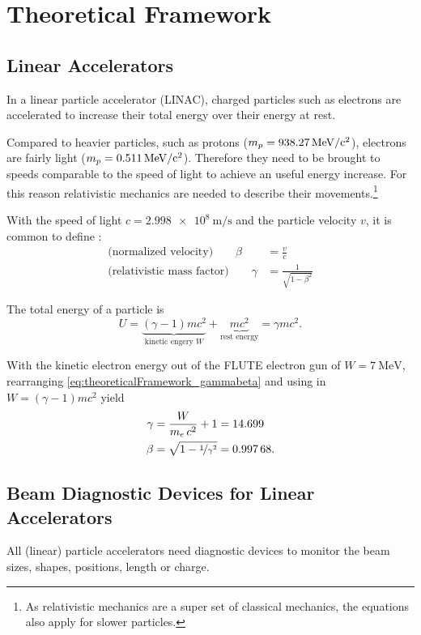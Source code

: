 \chapter{Theoretical Framework}
\section{Linear Accelerators}
In a linear particle accelerator (LINAC), charged particles such as electrons are accelerated to increase their total energy over their energy at rest.

Compared to heavier particles, such as protons ($m_p=\SI{938.27}{\mega\eV\per c\squared}$), electrons are fairly light ($m_p=\SI{0.511}{\mega\eV\per c\squared}$). Therefore they need to be brought to speeds comparable to the speed of light to achieve an useful energy increase. For this reason relativistic mechanics are needed to describe their movements.\footnote{As relativistic mechanics are a super set of classical mechanics, the equations also apply for slower particles.} \cite{Hinterberger1997}

With the speed of light $c=\SI{2.998e8}{\m\per\s}$ and the particle velocity $v$, it is common to define \cite{Wangler2008}:
\begin{align}\label{eq:theoreticalFramework_gammabeta}
\text{(normalized velocity)}\qquad\beta &= \frac{v}{c}\\
\text{(relativistic mass factor)}\qquad\gamma &= \frac{1}{\sqrt{1-\beta^2}}
\end{align}

The total energy of a particle is
\begin{equation}
U=\underbrace{\left(\gamma-1\right)mc^2}_{\text{kinetic engery } W} + \underbrace{mc^2}_{\text{rest energy}} = \gamma mc^2.
\end{equation}

With the kinetic electron energy out of the FLUTE electron gun of $W=\SI{7}{\mega\eV}$, rearranging \autoref{eq:theoreticalFramework_gammabeta} and using in $W=\left(\gamma-1\right)mc^2$ yield
\begin{align}
\gamma &= \frac{W}{m_e\,c^2}+1=\num{14.699}\\
\beta &= \sqrt{1-\nicefrac{1}{\gamma^2}}=\num{0.99768}.
\end{align}


\section{Beam Diagnostic Devices for Linear Accelerators}
All (linear) particle accelerators need diagnostic devices to monitor the beam sizes, shapes, positions, length or charge.


